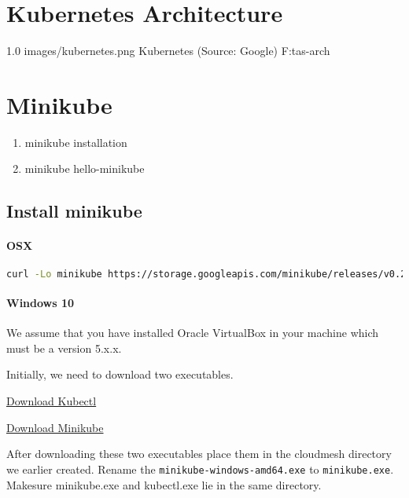 \section{Kubernetes Architecture}

    {1.0}
    {images/kubernetes.png}
    {Kubernetes (Source: Google)}
    {F:tas-arch} 

\section{Minikube}

\begin{enumerate}
\item minikube installation
\item minikube hello-minikube
\end{enumerate}

\subsection{Install minikube}

\paragraph{OSX}\label{osx}

\begin{lstlisting}[language=bash]
curl -Lo minikube https://storage.googleapis.com/minikube/releases/v0.25.0/minikube-darwin-amd64 && chmod +x minikube && sudo mv minikube /usr/local/bin/
\end{lstlisting}

\paragraph{Windows 10}\label{windows-10}

We assume that you have installed Oracle VirtualBox in your machine
which must be a version 5.x.x.

Initially, we need to download two executables.

\href{http://storage.googleapis.com/kubernetes-release/release/v1.4.0/bin/windows/amd64/kubectl.exe}{Download
Kubectl}

\href{https://storage.googleapis.com/minikube/releases/v0.25.0/minikube-windows-amd64.exe}{Download
Minikube}

After downloading these two executables place them in the cloudmesh
directory we earlier created. Rename the \verb|minikube-windows-amd64.exe|
to \verb|minikube.exe|. Makesure minikube.exe and kubectl.exe lie in the
same directory.

